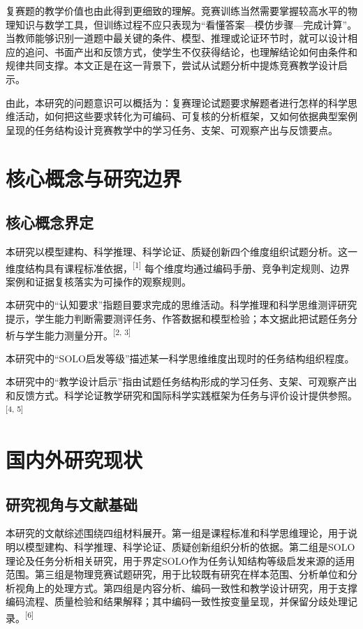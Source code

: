 \documentclass[
  12pt,
  a4paper,twoside,openany]{ctexbook}
\begin{document}
复赛题的教学价值也由此得到更细致的理解。竞赛训练当然需要掌握较高水平的物理知识与数学工具，但训练过程不应只表现为``看懂答案---模仿步骤---完成计算''。当教师能够识别一道题中最关键的条件、模型、推理或论证环节时，就可以设计相应的追问、书面产出和反馈方式，使学生不仅获得结论，也理解结论如何由条件和规律共同支撑。本文正是在这一背景下，尝试从试题分析中提炼竞赛教学设计启示。

由此，本研究的问题意识可以概括为：复赛理论试题要求解题者进行怎样的科学思维活动，如何把这些要求转化为可编码、可复核的分析框架，又如何依据典型案例呈现的任务结构设计竞赛教学中的学习任务、支架、可观察产出与反馈要点。

\section{核心概念与研究边界}\label{ux6838ux5fc3ux6982ux5ff5ux4e0eux7814ux7a76ux8fb9ux754c}

\subsection{核心概念界定}\label{ux6838ux5fc3ux6982ux5ff5ux754cux5b9a}

本研究以模型建构、科学推理、科学论证、质疑创新四个维度组织试题分析。这一维度结构具有课程标准依据，\textsuperscript{[1]}
每个维度均通过编码手册、竞争判定规则、边界案例和证据复核落实为可操作的观察规则。

本研究中的``认知要求''指题目要求完成的思维活动。科学推理和科学思维测评研究提示，学生能力判断需要测评任务、作答数据和模型检验；本文据此把试题任务分析与学生能力测量分开。\textsuperscript{[2, 3]}

本研究中的``SOLO启发等级''描述某一科学思维维度出现时的任务结构组织程度。

本研究中的``教学设计启示''指由试题任务结构形成的学习任务、支架、可观察产出和反馈方式。科学论证教学研究和国际科学实践框架为任务与评价设计提供参照。\textsuperscript{[4, 5]}

\section{国内外研究现状}\label{ux56fdux5185ux5916ux7814ux7a76ux73b0ux72b6}

\subsection{研究视角与文献基础}\label{ux7814ux7a76ux89c6ux89d2ux4e0eux6587ux732eux57faux7840}

本研究的文献综述围绕四组材料展开。第一组是课程标准和科学思维理论，用于说明以模型建构、科学推理、科学论证、质疑创新组织分析的依据。第二组是SOLO理论及任务分析相关研究，用于界定SOLO作为任务认知结构等级启发来源的适用范围。第三组是物理竞赛试题研究，用于比较既有研究在样本范围、分析单位和分析视角上的处理方式。第四组是内容分析、编码一致性和教学设计研究，用于支撑编码流程、质量检验和结果解释；其中编码一致性按变量呈现，并保留分歧处理记录。\textsuperscript{[6]}
\end{document}
